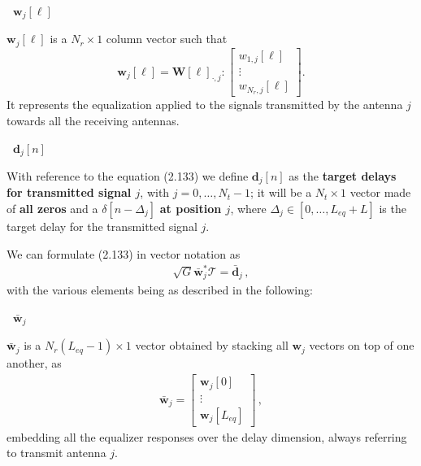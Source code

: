 \documentclass[a4paper, 12pt]{book}
\begin{document}
\begin{tcolorbox}[colback=obsidianBlue, colframe=white, boxrule=0pt, sharp corners]
    \textcolor{obsidianTextBlue}{\textbf{\faPen\ $\mathbf{w}_j[\ell]$}}
    
    $\mathbf{w}_j[\ell]$ is a $N_r \times 1$ column vector such that
    \[
    \mathbf{w}_j[\ell] = \mathbf{W}[\ell]_{\cdot, j} : 
    \begin{bmatrix}
     w_{1,j}[\ell] \\ \vdots \\ w_{N_r,j}[\ell]
    \end{bmatrix} .
    \]
    It represents the equalization applied to the signals transmitted by the antenna $j$ towards all the receiving antennas.
\end{tcolorbox}

\begin{tcolorbox}[colback=obsidianBlue, colframe=white, boxrule=0pt, sharp corners]
    \textcolor{obsidianTextBlue}{\textbf{\faPen\ $\mathbf{d}_j[n]$}}
    
    With reference to the equation (2.133) we define $\mathbf{d}_j[n]$ as the \textbf{target delays for transmitted signal $j$}, with $j=0, \dots, N_t-1$; it will be a $N_t \times 1$ vector made of \textbf{all zeros} and a $\delta[n-\Delta_j]$ \textbf{at position $j$}, where $\Delta_j \in [0, \dots, L_{eq}+L]$ is the target delay for the transmitted signal $j$.
\end{tcolorbox}

We can formulate (2.133) in vector notation as
\begin{align}
    \sqrt{G}\bar{\mathbf{w}}_j^* \mathcal{T} = \bar{\mathbf{d}}_j \,, \tag{2.137}
\end{align}
with the various elements being as described in the following:

\begin{tcolorbox}[colback=obsidianBlue, colframe=white, boxrule=0pt, sharp corners]
    \textcolor{obsidianTextBlue}{\textbf{\faPen\ $\bar{\mathbf{w}}_j$}}
    
    $\bar{\mathbf{w}}_j$ is a $N_r(L_{eq}-1) \times 1$ vector obtained by stacking all $\mathbf{w}_j$ vectors on top of one another, as
    \begin{align}
        \bar{\mathbf{w}}_j = \begin{bmatrix} \mathbf{w}_j[0] \\ \vdots \\ \mathbf{w}_j[L_{eq}] \end{bmatrix} \,, \tag{2.134}
    \end{align}
    embedding all the equalizer responses over the delay dimension, always referring to transmit antenna $j$.
\end{tcolorbox}
\end{document}
